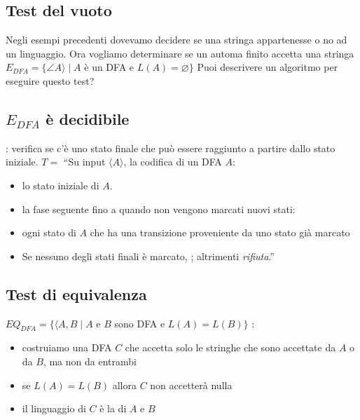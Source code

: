 \subsection{Test del vuoto}
Negli esempi precedenti dovevamo decidere se una stringa appartenesse o no ad un linguaggio.
Ora vogliamo determinare se un automa finito accetta una  stringa
$E_{DFA}=\{\angle A\rangle\mid A$ è un DFA e $L(A)=\varnothing\}$ 
Puoi descrivere un algoritmo per eseguire questo test? 

\subsection{$E_{DFA}$ è decidibile}
: verifica se c'è uno stato finale che può essere raggiunto a partire dallo stato iniziale. 
$T=$ ``Su input $\langle A\rangle$, la codifica di un DFA $A$: 
\begin{itemize}
	\item {} lo stato iniziale di $A$. 
	\item {} la fase seguente fino a quando non vengono marcati nuovi stati: 
	\item {} ogni stato di $A$ che ha una transizione proveniente da uno stato già marcato
	\item Se nessuno degli stati finali è marcato, ; altrimenti \textit{rifiuta}.''
\end{itemize}

\subsection{Test di equivalenza}
$EQ_{DFA} = \{\langle A,B\mid A$ e $B$ sono DFA e $L(A)=L(B)\}$ 
: 
\begin{itemize}
	\item costruiamo una DFA $C$ che accetta solo le stringhe che sono accettate da $A$ o da $B$, ma non da entrambi
	\item se $L(A)=L(B)$ allora $C$ non accetterà nulla
	\item il linguaggio di $C$ è la  di $A$ e $B$ 
\end{itemize}

